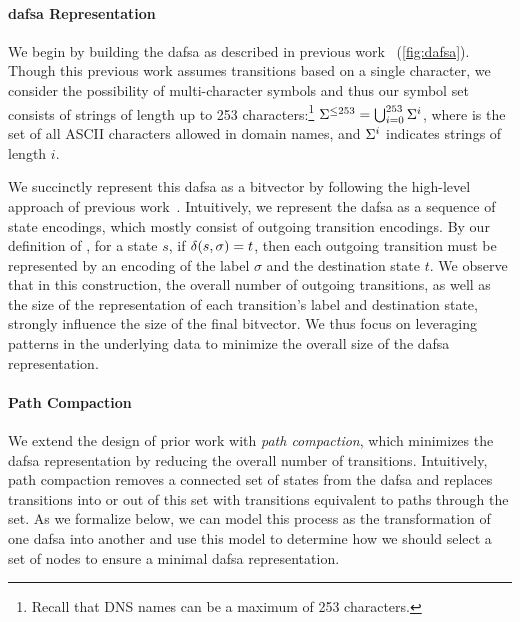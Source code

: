 \paragraph{\ac{dafsa} Representation}
We begin by building the \ac{dafsa} as described in previous
work~\cite{daciuk2000incremental} (\autoref{fig:dafsa}). Though this previous work assumes transitions
based on a single character, we consider the possibility of multi-character
symbols and thus our symbol set consists of strings of length up to 253
characters:\footnote{Recall that DNS names can be a maximum of 253 characters.}
$\Sigma^{\le 253} = \bigcup_{i=0}^{253} \Sigma^i$, where \symbols is the set of
all ASCII characters allowed in domain names, and $\Sigma^i$ indicates strings
of length $i$.

We succinctly represent this \ac{dafsa} as a bitvector by following the
high-level approach of previous work~\cite{daciuk2012smaller}. Intuitively, we
represent the \ac{dafsa} as a sequence of state encodings, which mostly consist
of outgoing transition encodings. By our definition of \transfunc, for a state
$s$, if $\delta(s, \sigma) = t$, then each outgoing transition must be
represented by an encoding of the label $\sigma$ and the destination state $t$.
We observe that in this construction, the overall number of outgoing
transitions, as well as the size of the representation of each transition's
label and destination state, strongly influence the size of the final bitvector.
We thus focus on leveraging patterns in the underlying data to minimize the
overall size of the \ac{dafsa} representation.

\paragraph{Path Compaction}
We extend the design of prior work with \emph{path compaction}, which
minimizes the \ac{dafsa} representation by reducing the overall number of
transitions. Intuitively, path compaction removes a connected set of states from
the \ac{dafsa} and replaces transitions into or out of this set with transitions
equivalent to paths through the set. As we formalize below, we can model this
process as the transformation of one \ac{dafsa} into another and use this model
to determine how we should select a set of nodes to ensure a minimal \ac{dafsa}
representation.

